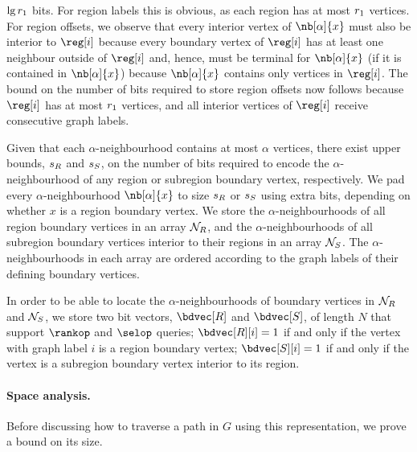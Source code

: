 \begin{enumerate}
\begin{itemize}
    $\lg r_1$ bits.
    For region labels this is obvious, as each region has at most $r_1$
    vertices.
    For region offsets, we observe that every interior vertex of
    $\nb[\alpha]{x}$ must also be interior to $\reg[i]$ because every
    boundary vertex of $\reg[i]$ has at least one neighbour outside of
    $\reg[i]$ and, hence, must be terminal for $\nb[\alpha]{x}$ (if it is
    contained in $\nb[\alpha]{x}$) because $\nb[\alpha]{x}$ contains only
    vertices in $\reg[i]$.
    The bound on the number of bits required to store region offsets now
    follows because $\reg[i]$ has at most $r_1$ vertices, and all interior
    vertices of $\reg[i]$ receive consecutive graph labels.
  \end{itemize}
\end{enumerate}

Given that each $\alpha$-neighbourhood contains at most $\alpha$
vertices, there exist upper bounds, $s_R$ and $s_S$, on the number of
bits required to encode the $\alpha$-neighbourhood of any region or
subregion boundary vertex, respectively.
We pad every $\alpha$-neighbourhood $\nb[\alpha]{x}$ to size $s_R$ or
$s_S$ using extra bits, depending on whether $x$ is a region boundary
vertex.
We store the $\alpha$-neighbourhoods of all region boundary vertices in
an array $\mathcal{N}_R$, and the $\alpha$-neighbourhoods of all subregion boundary
vertices interior to their regions in an array $\mathcal{N}_S$.
The $\alpha$-neighbourhoods in each array are ordered according to the graph
labels of their defining boundary vertices.

In order to be able to locate the $\alpha$-neighbourhoods of boundary vertices
in $\mathcal{N}_R$ and $\mathcal{N}_S$, we store two bit vectors,
$\regbdvec$ and $\subregbdvec$, of length $N$ that support $\rankop$
and $\selop$ queries;
$\regbdvec[i] = 1$ if and only if the vertex with graph label $i$ is a region
boundary vertex; $\subregbdvec[i] = 1$ if and only if the vertex is a subregion
boundary vertex interior to its region.

\paragraph{Space analysis.}

Before discussing how to traverse a path in $G$ using this
representation, we prove a bound on its size.

